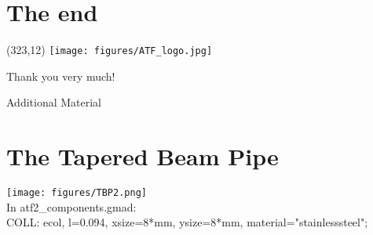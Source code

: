 \documentclass[xcolor={dvipsnames}]{beamer}
\newcommand{\ATFlogo}{
  \setlength{\TPHorizModule}{1pt}
  \setlength{\TPVertModule}{1pt}
  \begin{textblock}{1}(323,12)
   \texttt{[image: figures/ATF\_logo.jpg]}
  \end{textblock}
}
\begin{document}
\section*{The end}
{
\begin{frame}
\ATFlogo
\begin{center}
\textcolor{RubineRed}{
	\LARGE Thank you very much!\\
}
\end{center}
\end{frame}
}

\appendix

\begin{frame}
\begin{center}
\LARGE Additional Material
\end{center}
\end{frame}


\section{The Tapered Beam Pipe}
\begin{frame}
 \texttt{[image: figures/TBP2.png]}\\
 In atf2\_components.gmad:\\
 {\small COLL: ecol, l=0.094, xsize=8*mm, ysize=8*mm, material="stainlesssteel";}
\end{frame}
\end{document}
